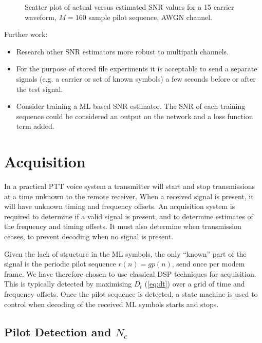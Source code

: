\documentclass{article}
\begin{document}
\begin{figure}[H]
\caption{Scatter plot of actual versus estimated SNR values for a 15 carrier waveform, $M=160$ sample pilot sequence, AWGN channel.}
\label{fig:est_snr}
\begin{center}

\end{center}
\end{figure}

Further work:
\begin{itemize}
\item Research other SNR estimators more robust to multipath channels.
\item For the purpose of stored file experiments it is acceptable to send a separate signals (e.g. a carrier or set of known symbols) a few seconds before or after the test signal.
\item Consider training a ML based SNR estimator.  The SNR of each training sequence could be considered an output on the network and a loss function term added.
\end{itemize}

\section{Acquisition}

In a practical PTT voice system a transmitter will start and stop transmissions at a time unknown to the remote receiver.  When a received signal is present, it will have unknown timing and frequency offsets. An acquisition system is required to determine if a valid signal is present, and to determine estimates of the frequency and timing offsets.  It must also determine when transmission ceases, to prevent decoding when no signal is present.
 
Given the lack of structure in the ML symbols, the only ``known'' part of the signal is the periodic pilot sequence $r(n)=gp(n)$, send once per modem frame.  We have therefore chosen to use classical DSP techniques for acquisition. This is typically detected by maximising $D_t$ (\ref{eq:dt}) over a grid of time and frequency offsets. Once the pilot sequence is detected, a state machine is used to control when decoding of the received ML symbols starts and stops.

\subsection{Pilot Detection and $N_c$}
\end{document}
